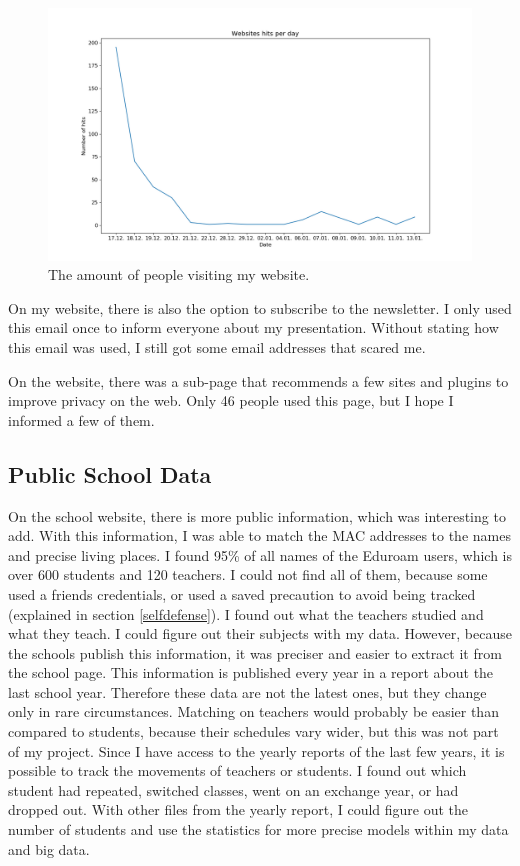 \documentclass[paper=a4, fontsize=11pt]{article}
\begin{document}
\begin{figure}
\centering
\includegraphics [width = 14cm]{images/websitevisiting.png}
\caption{The amount of people visiting my website.\label{fig:visiting}}
\end{figure}

On my website, there is also the option to subscribe to the newsletter. I only used this email once to inform everyone about my presentation. Without stating how this email was used, I still got some email addresses that scared me.

On the website, there was a sub-page that recommends a few sites and plugins to improve privacy on the web. Only 46 people used this page, but I hope I informed a few of them.

\subsection{Public School Data}
On the school website, there is more public information, which was interesting to add. With this information, I was able to match the MAC addresses to the names and precise living places. I found 95\% of all names of the Eduroam users, which is over 600 students and 120 teachers. I could not find all of them, because some used a friends credentials, or used a saved precaution to avoid being tracked (explained in section \ref{selfdefense}). I found out what the teachers studied and what they teach. I could figure out their subjects with my data. However, because the schools publish this information, it was preciser and easier to extract it from the school page. This information is published every year in a report about the last school year. Therefore these data are not the latest ones, but they change only in rare circumstances. Matching on teachers would probably be easier than compared to students, because their schedules vary wider, but this was not part of my project. Since I have access to the yearly reports of the last few years, it is possible to track the movements of teachers or students. I found out which student had repeated, switched classes, went on an exchange year, or had dropped out. With other files from the yearly report, I could figure out the number of students and use the statistics for more precise models within my data and big data.
\end{document}
